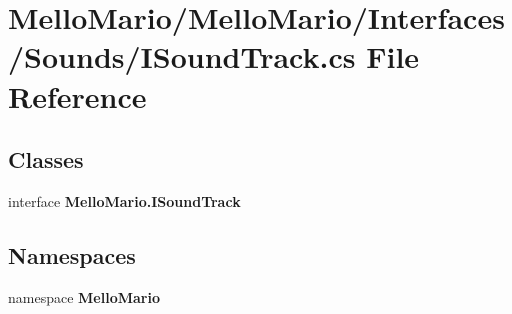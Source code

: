 \section{Mello\+Mario/\+Mello\+Mario/\+Interfaces/\+Sounds/\+I\+Sound\+Track.cs File Reference}
\label{ISoundTrack_8cs}
\subsection*{Classes}
\begin{DoxyCompactItemize}
\item 
interface \textbf{ Mello\+Mario.\+I\+Sound\+Track}
\end{DoxyCompactItemize}
\subsection*{Namespaces}
\begin{DoxyCompactItemize}
\item 
namespace \textbf{ Mello\+Mario}
\end{DoxyCompactItemize}
